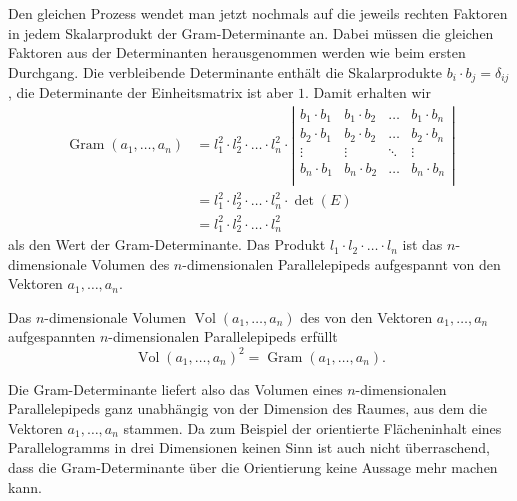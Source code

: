 Den gleichen Prozess wendet man jetzt nochmals auf die jeweils
rechten Faktoren in jedem Skalarprodukt der Gram-Determinante an.
Dabei müssen die gleichen Faktoren aus der Determinanten herausgenommen
werden wie beim ersten Durchgang.
Die verbleibende Determinante enthält die Skalarprodukte
$b_i\cdot b_j=\delta_{ij}$, die Determinante der Einheitsmatrix ist aber $1$.
Damit erhalten wir
\begin{align*}
\operatorname{Gram}(a_1,\dots,a_n)
&=
l_1^2\cdot l_2^2\cdot \ldots \cdot l_n^2
\cdot
\left|
\begin{matrix}
b_1\cdot b_1
	& b_1\cdot b_2
		&\dots  &b_1\cdot b_n\\
b_2\cdot b_1
	&b_2\cdot b_2
		&\dots  &b_2\cdot b_n\\
\vdots
	&\vdots
		&\ddots &\vdots     \\
b_n \cdot b_1
	&b_n\cdot b_2
		&\dots  &b_n\cdot b_n\\
\end{matrix}
\right|
\\
&=
l_1^2\cdot l_2^2\cdot \ldots \cdot l_n^2\cdot
\det(E)
\\
&=
l_1^2\cdot l_2^2\cdot \ldots \cdot l_n^2
\end{align*}
als den Wert der Gram-Determinante.
Das Produkt $l_1\cdot l_2\cdot\dots\cdot l_n$ ist das $n$-dimensionale
Volumen des $n$-dimensionalen Parallelepipeds aufgespannt von den Vektoren
$a_1,\dots,a_n$.

\begin{satz}
Das $n$-dimensionale Volumen $\operatorname{Vol}(a_1,\dots,a_n)$
des von den Vektoren $a_1,\dots,a_n$ aufgespannten $n$-dimensionalen
Parallelepipeds erfüllt
\[
\operatorname{Vol}(a_1,\dots,a_n)^2
=
\operatorname{Gram}(a_1,\dots,a_n).
\]
\end{satz}
Die Gram-Determinante liefert also das Volumen eines $n$-dimensionalen 
Parallelepipeds ganz unabhängig von der Dimension des Raumes, aus dem
die Vektoren $a_1,\dots,a_n$ stammen.
Da zum Beispiel der orientierte Flächeninhalt eines Parallelogramms
in drei Dimensionen keinen Sinn ist auch nicht überraschend, dass
die Gram-Determinante über die Orientierung keine Aussage mehr machen
kann.

